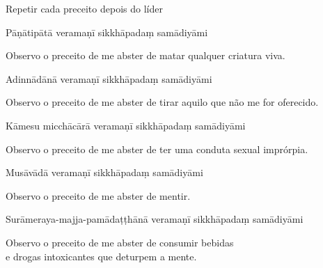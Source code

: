 {\begin{instruction}
  Repetir cada preceito depois do líder
\end{instruction}

\begin{precept}
  \setcounter{enumi}{0}
  \item Pāṇātipātā veramaṇī sikkhāpadaṃ samādiyāmi
\end{precept}

\begin{english}
  Observo o preceito de me abster de matar qualquer criatura viva.
\end{english}

\begin{precept}
  \setcounter{enumi}{1}
  \item Adinnādānā veramaṇī sikkhāpadaṃ samādiyāmi
\end{precept}

\begin{english}
  Observo o preceito de me abster de tirar aquilo que não me for oferecido.
\end{english}

\begin{precept}
  \setcounter{enumi}{2}
  \item Kāmesu micchācārā veramaṇī sikkhāpadaṃ samādiyāmi
\end{precept}

\begin{english}
  Observo o preceito de me abster de ter uma conduta sexual imprórpia.
\end{english}

\begin{precept}
  \setcounter{enumi}{3}
  \item Musāvādā veramaṇī sikkhāpadaṃ samādiyāmi
\end{precept}

\begin{english}
  Observo o preceito de me abster de mentir.
\end{english}

\begin{precept}
  \setcounter{enumi}{4}
  \item Surāmeraya-majja-pamādaṭṭhānā veramaṇī sikkhāpadaṃ samādiyāmi
\end{precept}

\begin{english}
  Observo o preceito de me abster de consumir bebidas\\
  e drogas intoxicantes que deturpem a mente.
\end{english}

}
